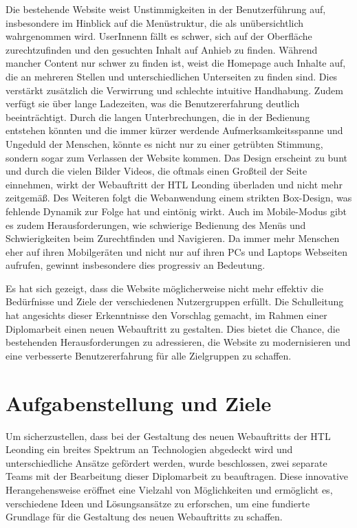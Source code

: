 Die bestehende Website weist Unstimmigkeiten in der Benutzerführung auf, 
insbesondere im Hinblick auf die Menüstruktur, die als unübersichtlich wahrgenommen wird. 
UserInnenn fällt es schwer, sich auf der Oberfläche zurechtzufinden und den gesuchten Inhalt auf Anhieb zu finden. 
Während mancher Content nur schwer zu finden ist, weist die Homepage auch Inhalte auf, 
die an mehreren Stellen und unterschiedlichen Unterseiten zu finden sind. Dies verstärkt zusätzlich 
die Verwirrung und schlechte intuitive Handhabung. Zudem verfügt sie über lange Ladezeiten, was die 
Benutzererfahrung deutlich beeinträchtigt. Durch die langen Unterbrechungen, 
die in der Bedienung entstehen könnten und die immer kürzer werdende Aufmerksamkeitsspanne und Ungeduld der Menschen, 
könnte es nicht nur zu einer getrübten Stimmung, sondern sogar zum Verlassen der Website kommen. Das Design erscheint 
zu bunt und durch die vielen Bilder Videos, die oftmals einen Großteil der Seite einnehmen, 
wirkt der Webauftritt der HTL Leonding überladen und nicht mehr zeitgemäß. Des Weiteren folgt die Webanwendung einem strikten
Box-Design, was fehlende Dynamik zur Folge hat und eintönig wirkt. Auch im Mobile-Modus gibt es zudem Herausforderungen,
wie schwierige Bedienung des Menüs und Schwierigkeiten beim Zurechtfinden und Navigieren. Da immer mehr Menschen eher auf 
ihren Mobilgeräten und nicht nur auf ihren PCs und Laptops Webseiten aufrufen, gewinnt insbesondere dies progressiv an Bedeutung.

Es hat sich gezeigt, dass die Website möglicherweise nicht mehr effektiv die Bedürfnisse und 
Ziele der verschiedenen Nutzergruppen erfüllt. Die Schulleitung hat angesichts dieser Erkenntnisse den Vorschlag gemacht, 
im Rahmen einer Diplomarbeit einen neuen Webauftritt zu gestalten. Dies bietet die Chance, die bestehenden 
Herausforderungen zu adressieren, die Website zu modernisieren und eine verbesserte Benutzererfahrung für alle Zielgruppen zu schaffen.


\section{Aufgabenstellung und Ziele}
Um sicherzustellen, dass bei der Gestaltung des neuen Webauftritts der HTL Leonding ein breites Spektrum an Technologien abgedeckt
 wird und unterschiedliche Ansätze gefördert werden, wurde beschlossen, zwei separate Teams mit der Bearbeitung dieser Diplomarbeit zu
  beauftragen. Diese innovative Herangehensweise eröffnet eine Vielzahl von Möglichkeiten und ermöglicht es, verschiedene Ideen und 
  Lösungsansätze zu erforschen, um eine fundierte Grundlage für die Gestaltung des neuen Webauftritts zu schaffen.

